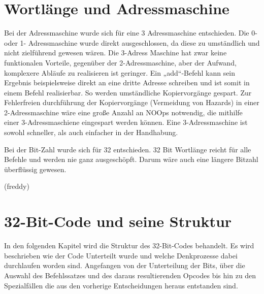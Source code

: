 \documentclass[paper=a4,fontsize=12pt,twocolumn]{scrreprt}
\begin{document}
\section{Wortlänge und Adressmaschine}


Bei der Adressmaschine wurde sich für eine 3 Adressmaschine entschieden.
Die 0- oder 1- Adressmaschine wurde direkt ausgeschlossen, da diese zu umständlich und nicht zielführend gewesen wären.
Die 3-Adress Maschine hat zwar keine funktionalen Vorteile, gegenüber der 2-Adressmaschine, aber der Aufwand, komplexere Abläufe zu realisieren ist geringer.
Ein „add“-Befehl kann sein Ergebnis beispielsweise direkt an eine dritte Adresse schreiben und ist somit in einem Befehl realisierbar.
So werden umständliche Kopiervorgänge gespart.
Zur Fehlerfreien durchführung der Kopiervorgänge (Vermeidung von Hazards) in einer 2-Adressmaschine wäre eine große Anzahl an NOOps notwendig, die mithilfe einer 3-Adressmaschiene eingespart werden können.
Eine 3-Adressmaschine ist sowohl schneller, als auch einfacher in der Handhabung.

Bei der Bit-Zahl wurde sich für 32 entschieden.
32 Bit Wortlänge reicht für alle Befehle und werden nie ganz ausgeschöpft.
Darum wäre auch eine längere Bitzahl überflüssig gewesen.


(freddy)

\section{ 32-Bit-Code und seine Struktur}

In den folgenden Kapitel wird die Struktur des 32-Bit-Codes behandelt.
Es wird beschrieben wie der Code Unterteilt wurde und welche Denkprozesse dabei durchlaufen worden sind.
Angefangen von der Unterteilung der Bits, über die Auswahl des Befehlssatzes und des daraus resultierenden Opcodes bis hin zu den Spezialfällen die aus den vorherige Entscheidungen heraus entstanden sind.
\end{document}
